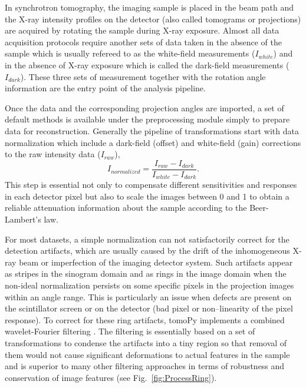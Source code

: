 \documentclass[pdf]{iucr}              %
\begin{document}
In synchrotron tomography, the imaging sample is placed in the beam path and the X-ray intensity profiles on the detector (also called tomograms or projections) are acquired by rotating the sample during X-ray exposure. Almost all data acquisition protocols require another sets of data taken in the absence of the sample which is usually refereed to as the white-field measurements ($I_{white}$) and in the absence of X-ray exposure which is called the dark-field measurements ($I_{dark}$). These three sets of measurement together with the rotation angle information are the entry point of the analysis pipeline.

Once the data and the corresponding projection angles are imported, a set of default methods is available under the preprocessing module simply to prepare data for reconstruction. Generally the pipeline of transformations start with data normalization which include a dark-field (offset) and white-field (gain) corrections to the raw intensity data ($I_{raw}$),
\begin{equation}
I_{normalized}=\frac{I_{{raw}}-I_{{dark}}}{I_{{white}}-I_{{dark}}}.
\end{equation}
This step is essential not only to compensate different sensitivities and responses in each detector pixel but also to scale the images between 0 and 1 to obtain a reliable attenuation information about the sample according to the Beer-Lambert's law. 

For most datasets, a simple normalization can not satisfactorily correct for the detection artifacts, which are usually caused by the drift of the inhomogeneous X-ray beam or imperfection of the imaging detector system. Such artifacts appear as stripes in the sinogram domain and as rings in the image domain when the non-ideal normalization persists on some specific pixels in the projection images within an angle range. This is particularly an issue when defects are present on the scintillator screen or on the detector (bad pixel or non--linearity of the pixel response). To correct for these ring artifacts, tomoPy implements a combined wavelet-Fourier filtering  \cite{Munch:09}. The filtering is essentially based on a set of transformations to condense the artifacts into a tiny region so that removal of them would not cause significant deformations to actual features in the sample and is superior to many other filtering approaches in terms of robustness and conservation of image features (see Fig.~\ref{fig:ProcessRing}).
\end{document}

